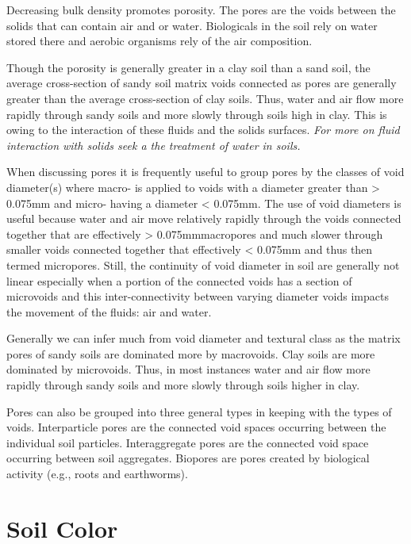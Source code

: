 \documentclass{book}
\begin{document}
Decreasing bulk density promotes porosity. The pores are the voids between the solids that can contain air and or water. Biologicals in the soil rely on water stored there and aerobic organisms rely of the air composition.

Though the porosity is generally greater in a clay soil than a sand soil, the average cross-section of sandy soil matrix voids connected as pores are generally greater than the average cross-section of clay soils. Thus, water and air flow more rapidly through sandy soils and more slowly through soils high in clay. This is owing to the interaction of these fluids and the solids surfaces. \textit{For more on fluid interaction with solids seek a the treatment of water in soils.}

When discussing pores it is frequently useful to group pores by the classes of void diameter(s) where macro- is applied to voids with a diameter greater than \num{> 0.075}{mm} and micro- having a diameter \num{< 0.075}{mm}. The use of void diameters is useful because water and air move relatively rapidly through the voids connected together that are effectively \num{> 0.075}{mm}\textemdash{}macropores\textemdash{} and much slower through smaller voids connected together that effectively \num{< 0.075}{mm} and thus then termed  micropores. Still, the continuity of void diameter in soil are generally not linear especially when a portion of the connected voids has a section of microvoids and this inter-connectivity between varying diameter voids impacts the movement of the fluids: air and water.

Generally we can infer much from void diameter and textural class as the matrix pores of sandy soils are dominated more by macrovoids. Clay soils are more dominated by microvoids. Thus, in most instances water and air flow more rapidly through sandy soils and more slowly through soils higher in clay.

Pores can also be grouped into three general types in keeping with the types of voids. Interparticle pores are the connected void spaces occurring between the individual soil particles. Interaggregate pores are the connected void space occurring between soil aggregates. Biopores are pores created by biological activity (e.g., roots and earthworms).

\section{Soil Color}
\label{color}
    
\end{document}
